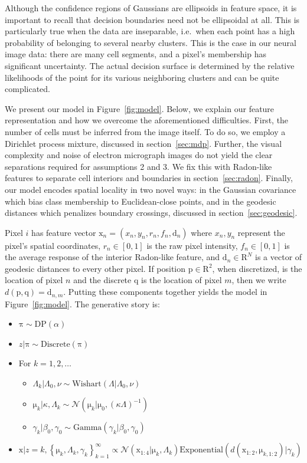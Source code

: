 \documentclass[english]{article}
\newcommand{\+}[1]{\ensuremath{\boldsymbol{\mathrm{#1}}}}
\begin{document}
Although the confidence regions of Gaussians are ellipsoids in feature space, it is important to recall that decision boundaries need not be ellipsoidal at all. This is particularly true when the data are inseparable, i.e.~when each point has a high probability of belonging to several nearby clusters. This is the case in our neural image data: there are many cell segments, and a pixel's membership has significant uncertainty. The actual decision surface is determined by the relative likelihoods of the point for its various neighboring clusters and can be quite complicated.

We present our model in Figure~\ref{fig:model}. Below, we explain our feature representation and how we overcome the aforementioned difficulties. First, the number of cells must be inferred from the image itself. To do so, we employ a Dirichlet process mixture, discussed in section~\ref{sec:mdp}. Further, the visual complexity and noise of electron micrograph images do not yield the clear separations required for assumptions 2 and 3. We fix this with Radon-like features \cite{Kumar2010} to separate cell interiors and boundaries in section~\ref{sec:radon}. Finally, our model encodes spatial locality in two novel ways: in the Gaussian covariance which bias class membership to Euclidean-close points, and in the geodesic distances which penalizes boundary crossings, discussed in section~\ref{sec:geodesic}.

Pixel $i$ has feature vector $\+{x}_n = (x_n, y_n, r_n, f_n, \+{d}_n)$ where $x_n, y_n$ represent the pixel's spatial coordinates, $r_n \in [0,1]$ is the raw pixel intensity, $f_n \in [0,1]$ is the average response of the interior Radon-like feature, and $\+{d}_n \in \+{R}^N$ is a vector of geodesic distances to every other pixel. If position $\+p \in \+R^2$, when discretized, is the location of pixel $n$ and the discrete $\+q$ is the location of pixel $m$, then we write $d(\+p, \+q) = \+d_{n,m}$. Putting these components together yields the model in Figure~\ref{fig:model}. The generative story is:

\begin{itemize}
\item $\+\pi \sim \text{DP}(\alpha)$
\item $z | \+\pi \sim \text{Discrete}(\+\pi)$
\item For $k = 1, 2, \ldots$
\begin{itemize}
\item $\Lambda_k | \Lambda_0, \nu \sim \text{Wishart}(\Lambda | \Lambda_0, \nu)$
\item $\+\mu_k | \kappa , \Lambda_k \sim \mathcal{N}\left( \+\mu_k | \+\mu_0 , (\kappa\Lambda)^{-1} \right)$
\item $\gamma_k | \beta_0, \gamma_0 \sim \text{Gamma}(\gamma_k | \beta_0, \gamma_0)$
\end{itemize}
\item $\+x | z = k, \left\{ \+\mu_k , \Lambda_k, \gamma_k \right\}_{k=1}^{\infty} \propto \mathcal{N}(\+x_{1:4} | \+\mu_k , \Lambda_k) \text{Exponential}\left( d(\+x_{1:2}, \+\mu_{k,1:2}) | \gamma_k \right) \label{eq:xlike}$
\end{itemize}
\end{document}
